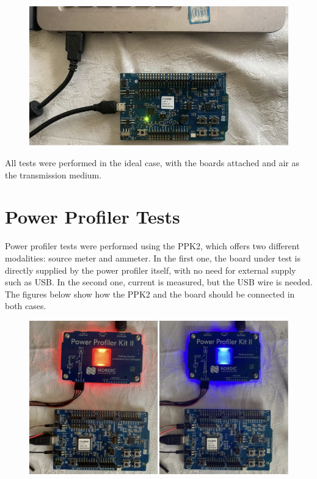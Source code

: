 \documentclass{Configuration_Files/PoliMi3i_thesis}
\begin{document}
\begin{figure}[h]
    \centering
    \includegraphics[scale=0.3]{Test_Procedure/7.png}
    \label{fig:direct_communication_board_PC}
\end{figure}

All tests were performed in the ideal case, with the boards attached and air as the transmission medium.

\section{Power Profiler Tests}
Power profiler tests were performed using the PPK2, which offers two different modalities: source meter and ammeter. In the first one, the board under test is directly supplied by the power profiler itself, with no need for external supply such as USB. In the second one, current is measured, but the USB wire is needed. The figures below show how the PPK2 and the board should be connected in both cases.

\begin{figure}[h]
    \centering
    \includegraphics[scale=0.3]{Test_Procedure/8.png}
    \label{fig:ppk2_source_amperemeter_mode}
\end{figure}
\end{document}
